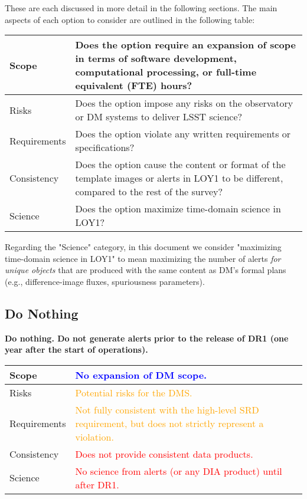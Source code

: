 \documentclass[DM,lsstdraft,toc]{lsstdoc}
\begin{document}
These are each discussed in more detail in the following sections.
The main aspects of each option to consider are outlined in the following table:
\begin{center}
\begin{tabular}{|p{2.5cm}|p{13cm}|}
\hline
Scope & Does the option require an expansion of scope in terms of software development, computational processing, or full-time equivalent (FTE) hours? \\
\hline
Risks & Does the option impose any risks on the observatory or DM systems to deliver LSST science?  \\
\hline
Requirements & Does the option violate any written requirements or specifications? \\
\hline
Consistency & Does the option cause the content or format of the template images or alerts in LOY1 to be different, compared to the rest of the survey? \\ 
\hline
Science & Does the option maximize time-domain science in LOY1? \\
\hline
\end{tabular}
\end{center} 

Regarding the "Science" category, in this document we consider "maximizing time-domain science in LOY1" to mean maximizing the number of alerts {\em for unique objects} that are produced with the same content as DM's formal plans (e.g., difference-image fluxes, spuriousness parameters). 

\clearpage
\subsection{Do Nothing}\label{ssec:potsol_donothing}

{\bf Do nothing. Do not generate alerts prior to the release of DR1 (one year after the start of operations).}

\begin{center}
\begin{tabular}{|p{2.5cm}|p{13cm}|}
\hline
Scope & \textcolor{blue}{No expansion of DM scope.} \\
\hline
Risks & \textcolor{orange}{Potential risks for the DMS.} \\
\hline
Requirements & \textcolor{orange}{Not fully consistent with the high-level SRD requirement, but does not strictly represent a violation.} \\
\hline
Consistency & \textcolor{red}{Does not provide consistent data products.} \\
\hline
Science & \textcolor{red}{No science from alerts (or any DIA product) until after DR1.} \\
\hline
\end{tabular}
\end{center}
\end{document}
